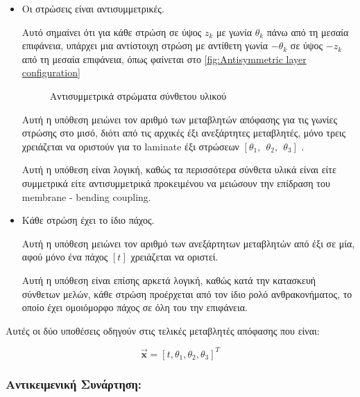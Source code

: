 \begin{itemize}
  \item
    Οι στρώσεις είναι αντισυμμετρικές.
  
  Αυτό σημαίνει ότι για κάθε στρώση σε ύψος \(z_{k}\) με γωνία \(\theta_{k}\) πάνω από τη μεσαία επιφάνεια, υπάρχει μια αντίστοιχη στρώση με αντίθετη γωνία  \(- \theta_{k}\) σε ύψος \(- z_{k}\) από τη μεσαία επιφάνεια, όπως φαίνεται στο \autoref{fig:Antisymmetric layer configuration} 

  

\begin{figure}[H]
    \centering
    
    \caption{Αντισυμμετρικά στρώματα σύνθετου υλικού}
    \label{fig:Antisymmetric layer configuration}
    
\end{figure}


Αυτή η υπόθεση μειώνει τον αριθμό των μεταβλητών απόφασης για τις γωνίες στρώσης στο μισό, διότι από τις αρχικές έξι ανεξάρτητες μεταβλητές, μόνο τρεις χρειάζεται να οριστούν για το \textlatin{laminate} έξι στρώσεων \([ \theta_{1},\ \ \theta_{2},\ \ \theta_{3}]\) .

Αυτή η υπόθεση είναι λογική, καθώς τα περισσότερα σύνθετα υλικά είναι είτε συμμετρικά είτε αντισυμμετρικά προκειμένου να μειώσουν την επίδραση του \textlatin{membrane - bending coupling}.

\item
  Κάθε στρώση έχει το ίδιο πάχος.

Αυτή η υπόθεση μειώνει τον αριθμό των ανεξάρτητων μεταβλητών από έξι σε μία, αφού μόνο ένα πάχος \([t]\) χρειάζεται να οριστεί.

Αυτή η υπόθεση είναι επίσης αρκετά λογική, καθώς κατά την κατασκευή σύνθετων μελών, κάθε στρώση προέρχεται από τον ίδιο ρολό ανθρακονήματος, το οποίο έχει ομοιόμορφο πάχος σε όλη του την επιφάνεια.
\end{itemize}


Αυτές οι δύο υποθέσεις οδηγούν στις τελικές μεταβλητές απόφασης που είναι:

\begin{equation}
\vec{\mathbf{x}}=[t,\theta_{1},\theta_{2},\theta_{3}]^{T}
\label{eq:descisionvars}
\end{equation}
\subsubsection{Αντικειμενική Συνάρτηση:}

